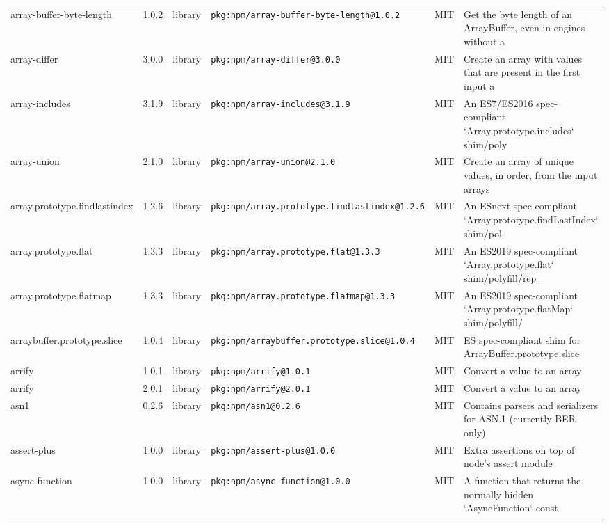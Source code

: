 \documentclass[11pt,a4paper]{article}
\begin{document}
\begin{longtable}{|p{4cm}|p{2cm}|p{1.6cm}|p{5cm}|p{1.5cm}|p{3.5cm}|}
\raggedright array-buffer-byte-length & 1.0.2 & library & \small\texttt{pkg:npm/array-buffer-byte-length@1.0.2} & MIT & \small Get the byte length of an ArrayBuffer, even in engines without a  \\
\raggedright array-differ & 3.0.0 & library & \small\texttt{pkg:npm/array-differ@3.0.0} & MIT & \small Create an array with values that are present in the first input a \\
\raggedright array-includes & 3.1.9 & library & \small\texttt{pkg:npm/array-includes@3.1.9} & MIT & \small An ES7/ES2016 spec-compliant `Array.prototype.includes` shim/poly \\
\raggedright array-union & 2.1.0 & library & \small\texttt{pkg:npm/array-union@2.1.0} & MIT & \small Create an array of unique values, in order, from the input arrays \\
\raggedright array.prototype.findlastindex & 1.2.6 & library & \small\texttt{pkg:npm/array.prototype.findlastindex@1.2.6} & MIT & \small An ESnext spec-compliant `Array.prototype.findLastIndex` shim/pol \\
\raggedright array.prototype.flat & 1.3.3 & library & \small\texttt{pkg:npm/array.prototype.flat@1.3.3} & MIT & \small An ES2019 spec-compliant `Array.prototype.flat` shim/polyfill/rep \\
\raggedright array.prototype.flatmap & 1.3.3 & library & \small\texttt{pkg:npm/array.prototype.flatmap@1.3.3} & MIT & \small An ES2019 spec-compliant `Array.prototype.flatMap` shim/polyfill/ \\
\raggedright arraybuffer.prototype.slice & 1.0.4 & library & \small\texttt{pkg:npm/arraybuffer.prototype.slice@1.0.4} & MIT & \small ES spec-compliant shim for ArrayBuffer.prototype.slice \\
\raggedright arrify & 1.0.1 & library & \small\texttt{pkg:npm/arrify@1.0.1} & MIT & \small Convert a value to an array \\
\raggedright arrify & 2.0.1 & library & \small\texttt{pkg:npm/arrify@2.0.1} & MIT & \small Convert a value to an array \\
\raggedright asn1 & 0.2.6 & library & \small\texttt{pkg:npm/asn1@0.2.6} & MIT & \small Contains parsers and serializers for ASN.1 (currently BER only) \\
\raggedright assert-plus & 1.0.0 & library & \small\texttt{pkg:npm/assert-plus@1.0.0} & MIT & \small Extra assertions on top of node's assert module \\
\raggedright async-function & 1.0.0 & library & \small\texttt{pkg:npm/async-function@1.0.0} & MIT & \small A function that returns the normally hidden `AsyncFunction` const \\

\end{longtable}
\end{document}
